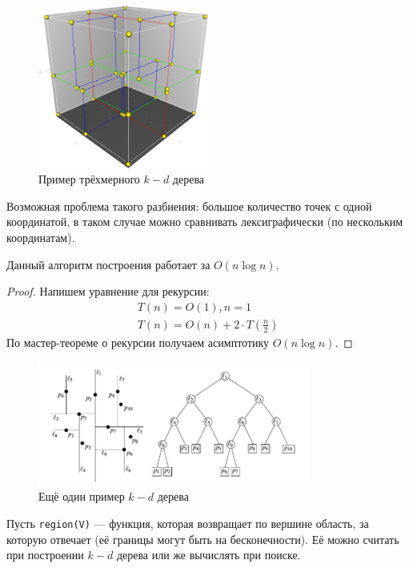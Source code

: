 \begin{figure}[H]    
  \centering    
  \includegraphics[width=0.5\textwidth]{figures/kdTree3D.png}    
  \caption*{Пример трёхмерного $k-d$ дерева}        
\end{figure} 

Возможная проблема такого разбиения: большое количество точек с одной координатой, в таком случае можно 
сравнивать лексиграфически (по нескольким координатам).

\begin{lemma}
  Данный алгоритм построения работает за $O(n \log n)$. 
\end{lemma}
\begin{proof}
  Напишем уравнение для рекурсии:
  \begin{gather*}
    T(n) = O(1), n = 1 \\
    T(n) = O(n) + 2 \cdot T\left( \frac{n}{2} \right)
  \end{gather*}
  По мастер-теореме о рекурсии получаем асимптотику $O(n \log n)$.
\end{proof}

\begin{figure}[H]    
  \centering    
  \includegraphics[width=0.8\textwidth]{figures/kdTreeConstruct.png}    
  \caption*{Ещё один пример $k-d$ дерева}        
\end{figure} 

Пусть  \texttt{region(V)} --- функция, которая возвращает по вершине область, за которую отвечает (её 
границы могут быть на бесконечности). Её можно считать при построении $k-d$ дерева или же вычислять
при поиске.

